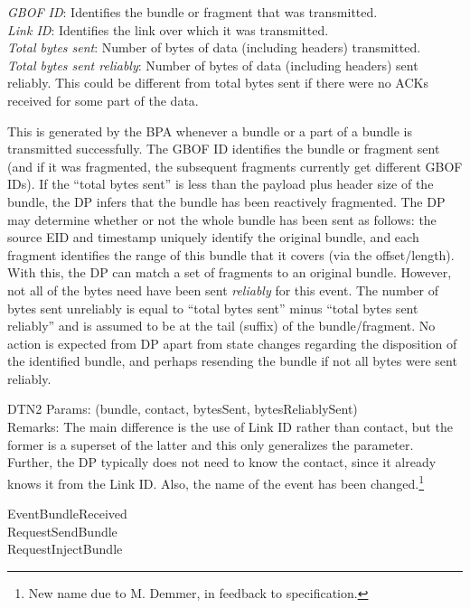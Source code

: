 {
\metP
    {\em GBOF ID}: Identifies the bundle or fragment that was transmitted.\\
    {\em Link ID}: Identifies the link over which it was transmitted.\\
    {\em Total bytes sent}: Number of bytes of data (including headers)
    transmitted.\\
    {\em Total bytes sent reliably}: Number of bytes of data (including
    headers) sent reliably. This could be different from total bytes sent
    if there were no ACKs received for some part of the data.

    This is generated by the BPA whenever a bundle or a part of a
    bundle is transmitted successfully. The GBOF ID identifies the
    bundle or fragment sent (and if it was fragmented, the subsequent
    fragments currently get different GBOF IDs).
    If the ``total bytes sent'' is less than the payload
    plus header size of the bundle, the DP infers that the bundle has
    been reactively fragmented. The DP may determine whether or not the
    whole bundle has been sent as follows: the source EID and timestamp
    uniquely identify the original bundle, and each fragment identifies
    the range of this bundle that it covers (via the offset/length). With
    this, the DP can match a set of fragments to an original bundle.
     However, not all of the bytes need have been sent
    {\em reliably} for this event. The number of bytes sent unreliably
    is equal to ``total bytes sent'' minus ``total bytes sent
    reliably'' and is assumed to be at the tail (suffix) of the
    bundle/fragment.  No action is expected from DP apart from state
    changes regarding the disposition of the identified bundle, and
    perhaps resending the bundle if not all bytes were sent reliably.
    
\metM
    DTN2 Params: (bundle, contact, bytesSent, bytesReliablySent)\\
    Remarks: The main difference is the use of Link ID rather than contact, 
    but the former is a superset of the latter and this only generalizes the
    parameter. Further, the DP typically does not need to know the contact,
    since it already knows it from the Link ID. Also, the name of the
    event has been changed.\footnote{New name due to M. Demmer, in feedback
    to specification.}
    
\metR
    EventBundleReceived\\
    RequestSendBundle\\
    RequestInjectBundle
}


